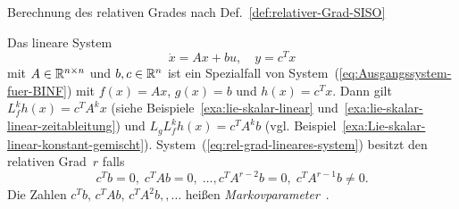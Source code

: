 \begin{algorithm}


\caption{Berechnung des relativen Grades nach Def.~\ref{def:relativer-Grad-SISO}\textsc{\label{alg:relativer-grad}}}
\end{algorithm}

\begin{remark}
\label{rem:rel-grad-Markovparameter}Das lineare System 
\begin{equation}
\dot{x}=Ax+bu,\quad y=c^{T}x\label{eq:rel-grad-lineares-system}
\end{equation}
mit $A\in{\mathbb{R}}^{n\times n}$ und $b,c\in{\mathbb{R}}^{n}$ ist ein Spezialfall
von System~(\ref{eq:Ausgangssystem-fuer-BINF}) mit $f(x)=Ax$, $g(x)=b$
und $h(x)=c^{T}x$. Dann gilt $L_{f}^{k}h(x)=c^{T}A^{k}x$ (siehe
Beispiele~\ref{exa:lie-skalar-linear} und~\ref{exa:lie-skalar-linear-zeitableitung})
und $L_{g}L_{f}^{k}h(x)=c^{T}A^{k}b$ (vgl. Beispiel~\ref{exa:Lie-skalar-linear-konstant-gemischt}).
System~(\ref{eq:rel-grad-lineares-system}) besitzt den relativen
Grad~$r$ falls 
\begin{equation}
c^{T}b=0,\;c^{T}Ab=0,\;\ldots,c^{T}A^{r-2}b=0,\;c^{T}A^{r-1}b\neq0.\label{eq:rel-grad-markov-parameter}
\end{equation}
Die Zahlen $c^{T}b,\,c^{T}Ab,\,c^{T}A^{2}b,,\ldots$ heißen \emph{Markovparameter}~\cite{isermann2,lunze-rt2}. 
\end{remark}

